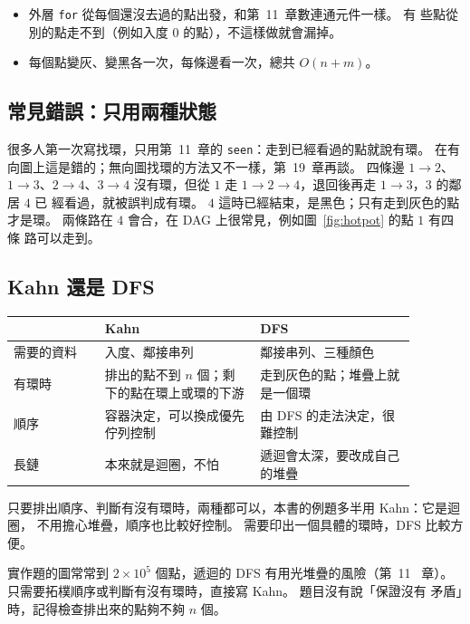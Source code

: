 \begin{itemize}
\item 外層 \texttt{for} 從每個還沒去過的點出發，和第~11~章數連通元件一樣。 有
些點從別的點走不到（例如入度 $0$ 的點），不這樣做就會漏掉。
\item 每個點變灰、變黑各一次，每條邊看一次，總共 $O(n + m)$。
\end{itemize}

\subsection{常見錯誤：只用兩種狀態}

很多人第一次寫找環，只用第~11~章的 \texttt{seen}：走到已經看過的點就說有環。
在有向圖上這是錯的；無向圖找環的方法又不一樣，第~19~章再談。 四條邊 $1 \to 2$、$1 \to 3$、$2 \to 4$、$3 \to 4$
沒有環，但從 $1$ 走 $1 \to 2 \to 4$，退回後再走 $1 \to 3$，$3$ 的鄰居 $4$ 已
經看過，就被誤判成有環。 $4$ 這時已經結束，是黑色；只有走到灰色的點才是環。
兩條路在 $4$ 會合，在 DAG 上很常見，例如圖~\ref{fig:hotpot} 的點 $1$ 有四條
路可以走到。

\subsection{Kahn 還是 DFS}

\begin{center}
\begin{tabular}{p{0.2\linewidth}p{0.34\linewidth}p{0.34\linewidth}}
\toprule
 & Kahn & DFS \\
\midrule
需要的資料 & 入度、鄰接串列 & 鄰接串列、三種顏色 \\
有環時 & 排出的點不到 $n$ 個；剩下的點在環上或環的下游 & 走到灰色的點；堆疊上就是一個環 \\
順序 & 容器決定，可以換成優先佇列控制 & 由 DFS 的走法決定，很難控制 \\
長鏈 & 本來就是迴圈，不怕 & 遞迴會太深，要改成自己的堆疊 \\
\bottomrule
\end{tabular}
\end{center}

只要排出順序、判斷有沒有環時，兩種都可以，本書的例題多半用 Kahn：它是迴圈，
不用擔心堆疊，順序也比較好控制。 需要印出一個具體的環時，DFS 比較方便。

\begin{apcsnote}
實作題的圖常常到 $2 \times 10^5$ 個點，遞迴的 DFS 有用光堆疊的風險（第~11~
章）。 只需要拓樸順序或判斷有沒有環時，直接寫 Kahn。 題目沒有說「保證沒有
矛盾」時，記得檢查排出來的點夠不夠 $n$ 個。
\end{apcsnote}

